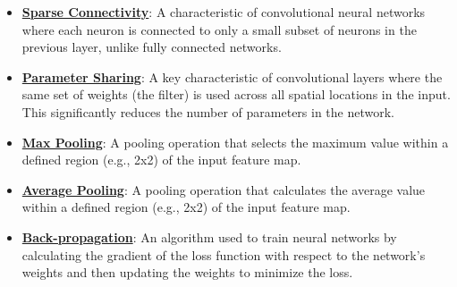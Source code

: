 \documentclass{article}%
\begin{document}
\begin{itemize}[leftmargin=*]
\item \href{https://purdue.brightspace.com/d2l/common/assets/pdfjs-d2l-dist/1.0.14-legacy/web/viewer.html?file=%2Fcontent%2Fenforced%2F1095467-wl.202510.CS.24300.001%2F09L1-cnn.pdf%3Fou%3D1095467&lang=en-us&container=d2l-fileviewer-rendered-pdf&fullscreen=d2l-fileviewer-rendered-pdf-dialog&height=667#page=10}{\textbf{Sparse Connectivity}}: A characteristic of convolutional neural networks where each neuron is connected to only a small subset of neurons in the previous layer, unlike fully connected networks.%
\item \href{https://purdue.brightspace.com/d2l/common/assets/pdfjs-d2l-dist/1.0.14-legacy/web/viewer.html?file=%2Fcontent%2Fenforced%2F1095467-wl.202510.CS.24300.001%2F09L1-cnn.pdf%3Fou%3D1095467&lang=en-us&container=d2l-fileviewer-rendered-pdf&fullscreen=d2l-fileviewer-rendered-pdf-dialog&height=667#page=12}{\textbf{Parameter Sharing}}: A key characteristic of convolutional layers where the same set of weights (the filter) is used across all spatial locations in the input. This significantly reduces the number of parameters in the network.%
\item \href{https://purdue.brightspace.com/d2l/common/assets/pdfjs-d2l-dist/1.0.14-legacy/web/viewer.html?file=%2Fcontent%2Fenforced%2F1095467-wl.202510.CS.24300.001%2F09L1-cnn.pdf%3Fou%3D1095467&lang=en-us&container=d2l-fileviewer-rendered-pdf&fullscreen=d2l-fileviewer-rendered-pdf-dialog&height=667#page=14}{\textbf{Max Pooling}}: A pooling operation that selects the maximum value within a defined region (e.g., 2x2) of the input feature map.%
\item \href{https://purdue.brightspace.com/d2l/common/assets/pdfjs-d2l-dist/1.0.14-legacy/web/viewer.html?file=%2Fcontent%2Fenforced%2F1095467-wl.202510.CS.24300.001%2F09L1-cnn.pdf%3Fou%3D1095467&lang=en-us&container=d2l-fileviewer-rendered-pdf&fullscreen=d2l-fileviewer-rendered-pdf-dialog&height=667#page=15}{\textbf{Average Pooling}}: A pooling operation that calculates the average value within a defined region (e.g., 2x2) of the input feature map.%
\item \href{https://purdue.brightspace.com/d2l/common/assets/pdfjs-d2l-dist/1.0.14-legacy/web/viewer.html?file=%2Fcontent%2Fenforced%2F1095467-wl.202510.CS.24300.001%2F09L1-cnn.pdf%3Fou%3D1095467&lang=en-us&container=d2l-fileviewer-rendered-pdf&fullscreen=d2l-fileviewer-rendered-pdf-dialog&height=667#page=16}{\textbf{Back-propagation}}: An algorithm used to train neural networks by calculating the gradient of the loss function with respect to the network's weights and then updating the weights to minimize the loss.%

\end{itemize}
\end{document}
